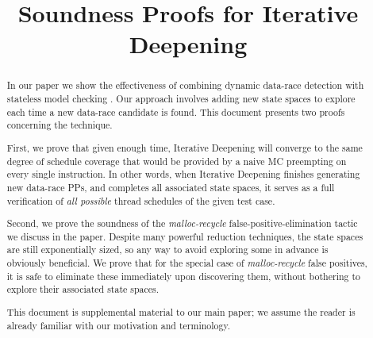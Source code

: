 \documentclass[pldi]{sigplanconf-pldi15}
\begin{document}
%
%

\newcommand\quicksand{\textsc{Quicksand}}
\newcommand\simics{\textsc{Simics}}
\newcommand{\sect}[1]{\S #1}
\newcommand\hilight[2]{\color{#1}#2\color{black}}

\title{Soundness Proofs for Iterative Deepening}

\maketitle
\begin{abstract}
In our paper we show the effectiveness of combining dynamic data-race detection \cite{eraser,hybriddatarace} with stateless model checking \cite{verisoft,dpor}.
Our approach involves adding new state spaces to explore each time a new data-race candidate is found.
This document presents two proofs concerning the technique.

First, we prove that given enough time, Iterative Deepening will converge to the same degree of schedule coverage that would be provided by a naive MC preempting on every single instruction.
In other words, when Iterative Deepening finishes generating new data-race PPs, and completes all associated state spaces,
it serves as a full verification of {\em all possible} thread schedules of the given test case.

Second, we prove the soundness of the {\em malloc-recycle} false-positive-elimination tactic we discuss in the paper.
Despite many powerful reduction techniques, the state spaces are still exponentially sized,
so any way to avoid exploring some in advance is obviously beneficial.
We prove that for the special case of {\em malloc-recycle} false positives, it is safe to eliminate these immediately upon discovering them, without bothering to explore their associated state spaces.


This document is supplemental material to our main paper; we assume the reader is already familiar with our motivation and terminology.
\end{abstract}

\end{document}
